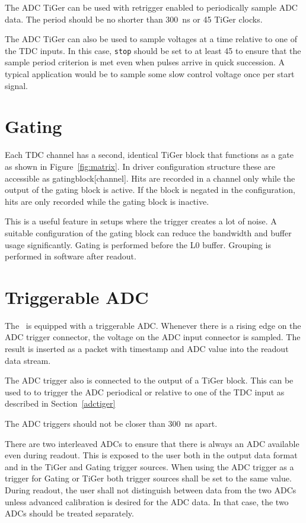 {    The ADC TiGer can be used with retrigger enabled to periodically
    sample ADC data.  The period should be no shorter than
    \SI{300}{\nano\second} or 45 TiGer clocks.

    The ADC TiGer can also be used to sample voltages at a time relative
    to one of the TDC inputs. In this case, \texttt{stop} should be set to
    at least 45 to ensure that the sample period criterion is met even
    when pulses arrive in quick succession. A typical application would be
    to sample some slow control voltage once per start signal.

    \newpage
    \section{Gating}
    Each TDC channel has a second, identical TiGer block that functions as a
    gate as shown in Figure~\ref{fig:matrix}. In driver configuration
    structure these are accessible as \textsf{gating\tu block[channel]}.  Hits
    are recorded in a channel only while the output of the gating block is
    active.  If the block is negated in the configuration, hits are only
    recorded while the gating block is inactive.
    
    This is a useful feature in setups where the trigger creates a lot of
    noise.  A suitable configuration of the gating block can reduce the
    bandwidth and buffer usage significantly.  Gating is performed before the
    L0 buffer. Grouping is performed in software after readout. 
        
    \section{Triggerable ADC}
    \label{adc}
    The \deviceName\ is equipped with a triggerable ADC.  Whenever there is a
    rising edge on the ADC trigger connector, the voltage on the ADC input
    connector is sampled.  The result is inserted as a packet with timestamp
    and ADC value into the readout data stream.

    The ADC trigger also is connected to the output of a TiGer block.  This
    can be used to to trigger the ADC periodical or relative to one of the TDC
    input as described in Section~\ref{adctiger}

    The ADC triggers should not be closer than \SI{300}{\nano\second} apart.

    There are two interleaved ADCs  to ensure that there is always an ADC
    available even during readout.  This is exposed to the user both in the
    output data format and in the TiGer and Gating trigger sources.  When
    using the ADC trigger as a trigger for Gating or TiGer both trigger
    sources shall be set to the same value.  During readout, the user shall
    not distinguish between data from the two ADCs unless advanced calibration
    is desired for the ADC data. In that case, the two ADCs should be treated
    separately.   
}{}